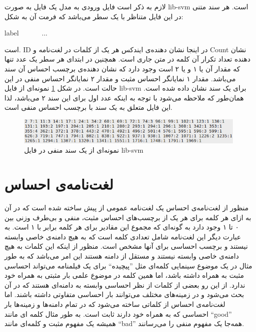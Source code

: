 لازم به ذکر است فایل ورودی به مدل یک فایل به صورت 
lib-svm
است. هر سند متنی در این فایل متناظر با یک سطر می‌‌باشد که فرمت آن به شکل:
\begin{latin}
	label \ <ID:Count> \ <ID:Count> \ <ID:Count> \ ... 
\end{latin} 
است.
ID
در اینجا نشان دهنده‌ی ایندکس هر یک از کلمات در لغت‌نامه و
Count
نشان دهنده تعداد تکرار آن کلمه در متن جاری است. همچنین در ابتدای هر سطر یک عدد تنها که مقدار آن یا ۱ و یا ۲ است وجود دارد که نشان دهند‌ه‌ی برچسب احساس آن سند می‌‌باشد. مقدار ۱ نمایانگر احساس مثبت و مقدار ۲ نمایانگر احساس منفی‌ در این حالت است. در شکل 
\ref{chap5-fig1}
نمونه‌ای از فایل 
lib-svm
برای یک سند نشان داده شده است. همان‌طور که ملاحظه می‌شود با توجه به اینکه عدد اول برای این سند ۲ می‌باشد، لذا این فایل متعلق به یک سند با برچسب احساس منفی است.
\begin{figure}[!t]
	\centering
	\includegraphics[scale=0.7]{chap5-img/libsvm-example}
	\caption{نمونه‌ای از یک سند منفی در فایل lib-svm}
	\label{chap5-fig1}
\end{figure}


\section{لغت‌نامه‌ی احساس}
\label{chap5sec5}
منظور از لغت‌نامه‌ی احساس یک لغت‌نامه عمومی‌ از پیش ساخته شده است که در آن به ازای هر کلمه برای هر یک از برچسب‌های احساس مثبت، منفی‌ و بی‌طرف وزنی بین ۰ تا ۱ وجود دارد به گونه‌ای که مجموع این مقادیر برای هر کلمه برابر با ۱ است. به عبارت دیگر این لغت‌نامه شامل تعدادی کلمه است که به هیچ دامنه‌ی خاصی‌ وابسته نیستند و برچسب احساسی‌ برای آنها مشخص است. منظور از اینکه این کلمات به هیچ دامنه‌ی خاصی‌ وابسته نیستند و مستقل از دامنه هستند این امر می‌‌باشد که به طور مثال در یک موضوع سینمایی کلمه‌ای مثل ''پیچیده`` برای یک فیلمنامه می‌‌تواند احساسی‌ مثبت به همراه داشته باشد، اما همین کلمه در موضوع علمی‌ بار مثبتی به همراه خود ندارد. از این رو بعضی‌ از کلمات از نظر احساسی‌ وابسته به دامنه‌ای هستند که در آن بحث می‌‌شود و در زمینه‌های مختلف می‌‌توانند بار احساسی‌ متفاوتی داشته باشند. اما لغت‌نامه‌ی احساس از کلماتی ساخته می‌‌شود که در تمام دامنه‌‌ها و زمینه‌ها بار احساسی‌ که به همراه خود دارند ثابت است. به طور مثال کلمه ای‌ مانند
``good''
همیشه یک مفهوم مثبت و کلمه‌ای مانند
``bad'' 
 همه‌‌جا یک مفهوم منفی‌ را می‌‌رسانند.

